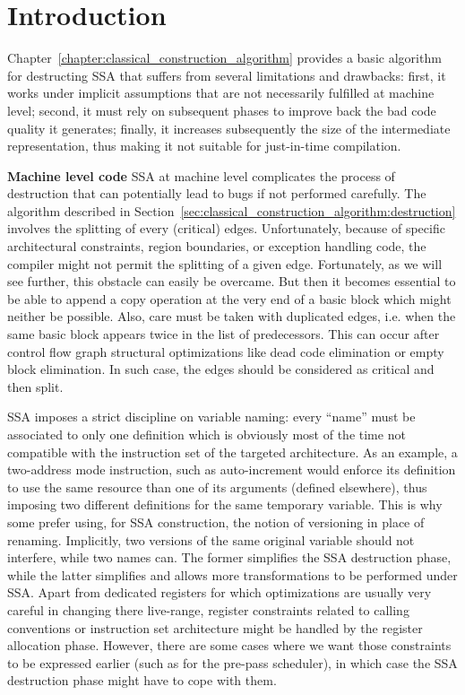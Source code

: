 \section{Introduction}
Chapter~\ref{chapter:classical_construction_algorithm} provides a basic algorithm for destructing SSA that suffers from several limitations and drawbacks: first, it works under implicit assumptions that are not necessarily fulfilled at machine level; second, it must rely on subsequent phases to improve back the bad code quality it generates; finally, it increases subsequently the size of the intermediate representation, thus making it not suitable for just-in-time compilation.   

{\bf Machine level code}
SSA at machine level complicates the process of destruction that can potentially lead to bugs if not performed carefully. The algorithm described in Section~\ref{sec:classical_construction_algorithm:destruction} involves the splitting of every (critical) edges. Unfortunately, because of specific architectural constraints, region boundaries, or exception handling code, the compiler might not permit the splitting of a given edge. Fortunately, as we will see further, this obstacle can easily be overcame. But then it becomes essential to be able to append a copy operation at the very end of a basic block which might neither be possible. Also, care must be taken with duplicated edges, i.e. when the same basic block appears twice in the list of predecessors.
This can occur after control flow graph structural optimizations like
dead code elimination or empty block elimination.
In such case, the edges should be considered as critical and then split.

SSA imposes a strict discipline on variable naming: every ``name'' must be associated to only one definition which is obviously most of the time not compatible with the instruction set of the targeted architecture. As an example, a two-address mode instruction, such as auto-increment would enforce its definition to use the same resource than one of its arguments (defined elsewhere), thus imposing two different definitions for the same temporary variable. This is why some prefer using, for SSA construction, the notion of versioning in place of renaming. Implicitly, two versions of the same original variable should not interfere, while two names can. The former simplifies the SSA destruction phase, while the latter simplifies and allows more transformations to be performed under SSA. Apart from dedicated registers for which optimizations are usually very careful in changing there live-range, register constraints related to calling conventions or instruction set architecture might be handled by the register allocation phase. However, there are some cases where we want those constraints to be expressed earlier (such as for the pre-pass scheduler), in which case the SSA destruction phase might have to cope with them.

